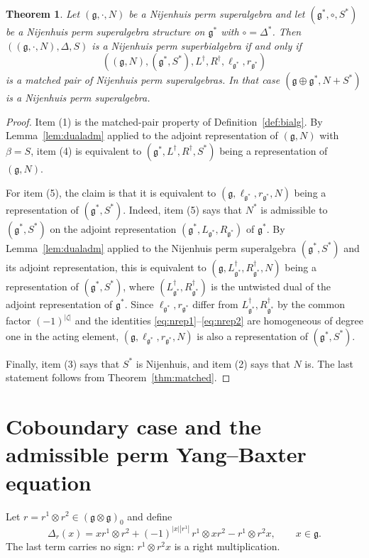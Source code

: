 \documentclass[11pt]{article}
\newtheorem{theorem}{Theorem}[section]
\theoremstyle{definition}
\newcommand{\g}{\mathfrak{g}}
\begin{document}
\begin{theorem}\label{thm:bialg}
Let $(\g,\cdot,N)$ be a Nijenhuis perm superalgebra and let $(\g^*,\circ,S^*)$ be a Nijenhuis perm superalgebra structure on $\g^*$ with $\circ=\Delta^*$. Then $((\g,\cdot,N),\Delta,S)$ is a Nijenhuis perm superbialgebra if and only if
\[
((\g,N),(\g^*,S^*),L^\dagger,R^\dagger,\ell_{\g^*},r_{\g^*})
\]
is a matched pair of Nijenhuis perm superalgebras. In that case $(\g\oplus\g^*,N+S^*)$ is a Nijenhuis perm superalgebra.
\end{theorem}
\begin{proof}
Item (1) is the matched-pair property of Definition~\ref{def:bialg}. By Lemma~\ref{lem:dualadm} applied to the adjoint representation of $(\g,N)$ with $\beta=S$, item (4) is equivalent to $(\g^*,L^\dagger,R^\dagger,S^*)$ being a representation of $(\g,N)$.

For item (5), the claim is that it is equivalent to $(\g,\ell_{\g^*},r_{\g^*},N)$ being a representation of $(\g^*,S^*)$. Indeed, item (5) says that $N^*$ is admissible to $(\g^*,S^*)$ on the adjoint representation $(\g^*,L_{\g^*},R_{\g^*})$ of $\g^*$. By Lemma~\ref{lem:dualadm} applied to the Nijenhuis perm superalgebra $(\g^*,S^*)$ and its adjoint representation, this is equivalent to $(\g,L^\dagger_{\g^*},R^\dagger_{\g^*},N)$ being a representation of $(\g^*,S^*)$, where $(L^\dagger_{\g^*},R^\dagger_{\g^*})$ is the untwisted dual of the adjoint representation of $\g^*$. Since $\ell_{\g^*},r_{\g^*}$ differ from $L^\dagger_{\g^*},R^\dagger_{\g^*}$ by the common factor $(-1)^{|\zeta|}$ and the identities \eqref{eq:nrep1}--\eqref{eq:nrep2} are homogeneous of degree one in the acting element, $(\g,\ell_{\g^*},r_{\g^*},N)$ is also a representation of $(\g^*,S^*)$.

Finally, item (3) says that $S^*$ is Nijenhuis, and item (2) says that $N$ is. The last statement follows from Theorem~\ref{thm:matched}.
\end{proof}

\section{Coboundary case and the admissible perm Yang--Baxter equation}\label{sec:coboundary}

Let $r=r^1\otimes r^2\in(\g\otimes\g)_0$ and define
\begin{equation}\label{eq:deltar}
\Delta_r(x)=x r^1\otimes r^2+(-1)^{|x||r^1|}\,r^1\otimes xr^2-r^1\otimes r^2x,
\qquad x\in\g.
\end{equation}
The last term carries no sign: $r^1\otimes r^2x$ is a right multiplication.
\end{document}
